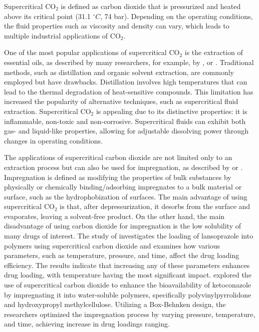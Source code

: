 \documentclass[../Article_Model_Parameters.tex]{subfiles}
\begin{document}
	
	Supercritical CO$_2$ is defined as carbon dioxide that is pressurized and heated above its critical point (31.1 $^\circ C$, 74 bar). Depending on the operating conditions, the fluid properties such as viscosity and density can vary, which leads to multiple industrial applications of CO$_2$.
	
	One of the most popular applications of supercritical CO$_2$ is the extraction of essential oils, as described by many researchers, for example, by \citet{Sodeifian2017}, \citet{Reverchon1993} or \citet{Sovova1994}. Traditional methods, such as distillation and organic solvent extraction, are commonly employed but have drawbacks. Distillation involves high temperatures that can lead to the thermal degradation of heat-sensitive compounds. This limitation has increased the popularity of alternative techniques, such as supercritical fluid extraction. Supercritical CO$_2$ is appealing due to its distinctive properties: it is inflammable, non-toxic and non-corrosive. Supercritical fluids can exhibit both gas- and liquid-like properties, allowing for adjustable dissolving power through changes in operating conditions.
	
	The applications of supercritical carbon dioxide are not limited only to an extraction process but can also be used for impregnation, as described by \citet{Weidner2018} or \citet{Machado2022}. Impregnation is defined as modifying the properties of bulk substances by physically or chemically binding/adsorbing impregnates to a bulk material or surface, such as the hydrophobization of surfaces. The main advantage of using supercritical CO$_2$ is that, after depressurization, it desorbs from the surface and evaporates, leaving a solvent-free product. On the other hand, the main disadvantage of using carbon dioxide for impregnation is the low solubility of many drugs of interest.
	The study of \citet{Ameri2020} investigates the loading of lansoprazole into polymers using supercritical carbon dioxide and examines how various parameters, such as temperature, pressure, and time, affect the drug loading efficiency. The results indicate that increasing any of these parameters enhances drug loading, with temperature having the most significant impact. \citet{Fathi2022} explored the use of supercritical carbon dioxide to enhance the bioavailability of ketoconazole by impregnating it into water-soluble polymers, specifically polyvinylpyrrolidone and hydroxypropyl methylcellulose. Utilizing a Box-Behnken design, the researchers optimized the impregnation process by varying pressure, temperature, and time, achieving increase in drug loadings ranging.
	
\end{document}
